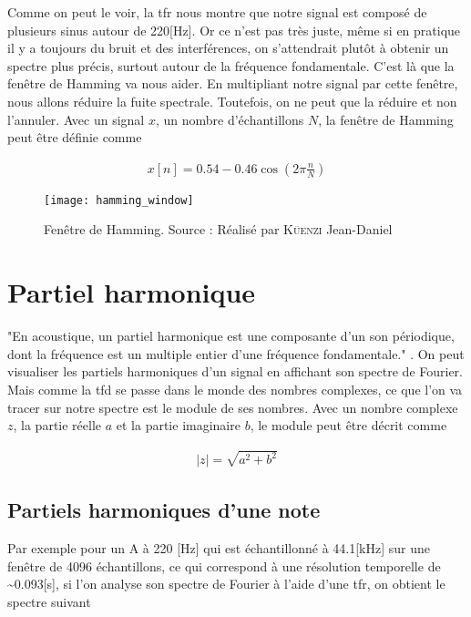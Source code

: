 Comme on peut le voir, la \gls{tfr} nous montre que notre signal est composé de plusieurs sinus autour de 220[Hz]. Or ce n'est pas très juste, même si en pratique il y a toujours du bruit et des interférences, on s'attendrait plutôt à obtenir un spectre plus précis, surtout autour de la fréquence fondamentale. C'est là que la fenêtre de Hamming va nous aider. En multipliant notre signal par cette fenêtre, nous allons réduire la fuite spectrale. Toutefois, on ne peut que la réduire et non l'annuler. Avec un signal $x$, un nombre d'échantillons $N$, la fenêtre de Hamming peut être définie comme

{\Large
	\setlength{\abovedisplayskip}{-0.5cm}
	\begin{align*}
		x[n] = 0.54 - 0.46 \cos(2\pi\frac{n}{N})
	\end{align*}
}

\begin{figure}[H]
	\centering
	\texttt{[image: hamming\_window]}
	\caption[Fenêtre de Hamming]{Fenêtre de Hamming. Source : Réalisé par \textsc{Küenzi} Jean-Daniel}
	\label{fig:hamming_window}
\end{figure}

\section{Partiel harmonique}
\label{sec:2.8}

"En acoustique, un partiel harmonique est une composante d’un son périodique, dont la fréquence est un multiple entier d'une fréquence fondamentale." \parencite{noauthor_harmonique_2021}. On peut visualiser les partiels harmoniques d'un signal en affichant son spectre de Fourier. Mais comme la \gls{tfd} se passe dans le monde des nombres complexes, ce que l'on va tracer sur notre spectre est le module de ses nombres. Avec un nombre complexe $z$, la partie réelle $a$ et la partie imaginaire $b$, le module peut être décrit comme

{\Large
	\setlength{\abovedisplayskip}{-0.5cm}
	\begin{align*}
		\lvert z\rvert = \sqrt{a^2 + b^2}
	\end{align*}
}

\subsection{Partiels harmoniques d'une note}

Par exemple pour un A à 220 [Hz] qui est échantillonné à 44.1[kHz] sur une fenêtre de 4096 échantillons, ce qui correspond à une résolution temporelle de \textasciitilde0.093[s], si l'on analyse son spectre de Fourier à l’aide d’une \gls{tfr}, on obtient le spectre suivant

